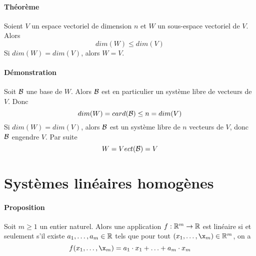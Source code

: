 \paragraph{Théorème} Soient $V$ un espace vectoriel de dimension $n$ et $W$ un sous-espace vectoriel de $V$. Alors 
$$dim(W) \leq dim(V)$$
  Si $dim(W) = dim(V)$, alors $W = V$.
  
\paragraph{Démonstration} Soit $\mathcal{B}$ une base de $W$. Alors $\mathcal{B}$ est en particulier un système libre de vecteurs de $V$. Donc 
$$dim(W) = card(\mathcal{B}) \leq n = dim(V)$$
Si $dim(W) = dim(V)$, alors $\mathcal{B}$ est un système libre de $n$ vecteurs de $V$, donc  $\mathcal{B}$ engendre $V$. Par suite 
$$W = Vect(\mathcal{B}) = V$$

%
%
\section{Systèmes linéaires homogènes}
%
%
\paragraph{Proposition} Soit $m \geq 1$ un entier naturel. Alors une application $f: \mathbb{R}^m \rightarrow \mathbb{R}$ est linéaire si et seulement s'il existe $a_1, \ldots, a_m \in \mathbb{R}$ tels que pour tout $(x_1, \ldots, \x_m) \in \R^m$, on a
$$f(x_1, \ldots, \x_m) = a_1 \cdot x_1 + \ldots + a_m \cdot x_m$$

